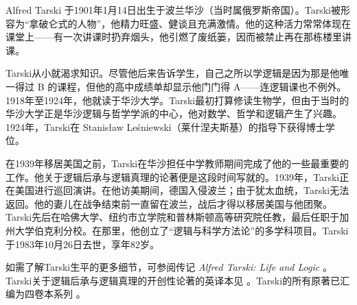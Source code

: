 \documentclass[../../../include/open-logic-section]{subfiles}
\begin{document}



Alfred Tarski 于1901年1月14日出生于波兰华沙（当时属俄罗斯帝国）。Tarski被形容为“拿破仑式的人物”，他精力旺盛、健谈且充满激情。他的这种活力常常体现在课堂上——有一次讲课时扔弃烟头，他引燃了废纸篓，因而被禁止再在那栋楼里讲课。

Tarski从小就渴求知识。尽管他后来告诉学生，自己之所以学逻辑是因为那是他唯一得过 B 的课程，但他的高中成绩单却显示他门门得 A——连逻辑课也不例外。1918年至1924年，他就读于华沙大学。Tarski最初打算修读生物学，但由于当时的华沙大学正是华沙逻辑与哲学学派的中心，他对数学、哲学和逻辑产生了兴趣。1924年，Tarski在 Stanisław Leśniewski（莱什涅夫斯基）的指导下获得博士学位。

在1939年移居美国之前，Tarski在华沙担任中学教师期间完成了他的一些最重要的工作。他关于逻辑后承与逻辑真理的论著便是这段时间写就的。1939年，Tarski正在美国进行巡回演讲。在他访美期间，德国入侵波兰；由于犹太血统，Tarski无法返回。他的妻儿在战争结束前一直留在波兰，战后才得以移居美国与他团聚。Tarski先后在哈佛大学、纽约市立学院和普林斯顿高等研究院任教，最后任职于加州大学伯克利分校。在那里，他创立了“逻辑与科学方法论”的多学科项目。Tarski于1983年10月26日去世，享年82岁。

\begin{reading}
如需了解Tarski生平的更多细节，可参阅传记 \emph{Alfred Tarski: Life and Logic} \citep{Feferman2004}。Tarski关于逻辑后承与逻辑真理的开创性论著的英译本见 \citep{Tarski1983}。Tarski的所有原著已汇编为四卷本系列 \citep{Tarski1981}。
\end{reading}
\end{document}
